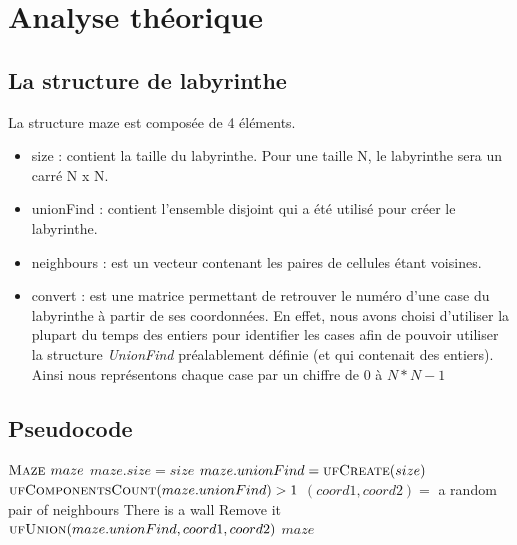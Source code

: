 
\usepackage{clrscode3e}





\section{Analyse théorique}
\subsection{} %
\subsection{} %
	
\subsection{La structure de labyrinthe} %
La structure maze est composée de 4 éléments.
\begin{itemize}
\item size : contient la taille du labyrinthe. Pour une taille N, le labyrinthe sera un carré N x N.
\item unionFind : contient l'ensemble disjoint qui a été utilisé pour créer le labyrinthe.
\item neighbours : est un vecteur contenant les paires de cellules étant voisines.
\item convert : est une matrice permettant de retrouver le numéro d'une case du labyrinthe à partir de ses coordonnées.
\bigbreak
En effet, nous avons choisi d'utiliser la plupart du temps des entiers pour identifier les cases afin de pouvoir utiliser la structure \textit{UnionFind} préalablement définie (et qui contenait des entiers). Ainsi nous représentons chaque case par un chiffre de $0$ à $N *N - 1$
\end{itemize}

\subsection{Pseudocode} %
\begin{codebox}
\li $\textnormal{\scshape Maze } maze$
\li $maze.size = size$
\li $maze.unionFind = \textnormal{\scshape ufCreate}(size)$
\li \While $\textnormal{\scshape ufComponentsCount}(maze.unionFind) > 1$
\Do
\li 	$(coord1, coord2) =$ a random pair of neighbours
\li		\If There is a wall
\li \Then Remove it
\li	$\textnormal{\scshape ufUnion}(maze.unionFind, coord1, coord2)$
\End
\End
\li \Return $maze$
\End
\end{codebox}

